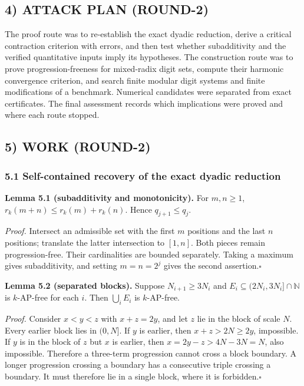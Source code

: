 \subsection{4) ATTACK PLAN (ROUND-2)}

The proof route was to re-establish the exact dyadic reduction, derive a critical contraction criterion with errors, and then test whether subadditivity and the verified quantitative inputs imply its hypotheses. The construction route was to prove progression-freeness for mixed-radix digit sets, compute their harmonic convergence criterion, and search finite modular digit systems and finite modifications of a benchmark. Numerical candidates were separated from exact certificates. The final assessment records which implications were proved and where each route stopped.

\subsection{5) WORK (ROUND-2)}

\subsubsection{5.1 Self-contained recovery of the exact dyadic reduction}

\noindent\textbf{Lemma 5.1 (subadditivity and monotonicity).}
For $m,n\ge1$, $r_k(m+n)\le r_k(m)+r_k(n)$. Hence $q_{j+1}\le q_j$.

\noindent\emph{Proof.}
Intersect an admissible set with the first $m$ positions and the last $n$ positions; translate the latter intersection to $[1,n]$. Both pieces remain progression-free. Their cardinalities are bounded separately. Taking a maximum gives subadditivity, and setting $m=n=2^j$ gives the second assertion.\hfill$\square$

\medskip
\noindent\textbf{Lemma 5.2 (separated blocks).}
Suppose $N_{i+1}\ge3N_i$ and $E_i\subseteq(2N_i,3N_i]\cap\mathbb N$ is $k$-AP-free for each $i$. Then $\bigcup_iE_i$ is $k$-AP-free.

\noindent\emph{Proof.}
Consider $x<y<z$ with $x+z=2y$, and let $z$ lie in the block of scale $N$. Every earlier block lies in $(0,N]$. If $y$ is earlier, then $x+z>2N\ge2y$, impossible. If $y$ is in the block of $z$ but $x$ is earlier, then $x=2y-z>4N-3N=N$, also impossible. Therefore a three-term progression cannot cross a block boundary. A longer progression crossing a boundary has a consecutive triple crossing a boundary. It must therefore lie in a single block, where it is forbidden.\hfill$\square$

